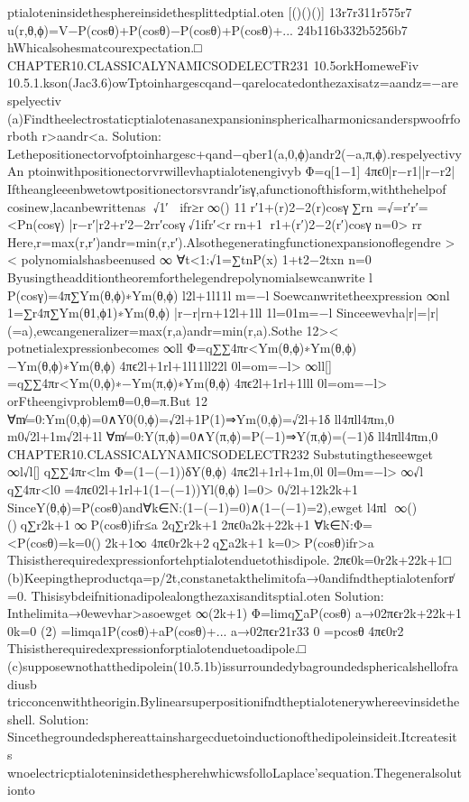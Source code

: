 {{{{{{{{{{{{{{{ptialoteninsidethesphereinsidethesplittedptial.oten
[()()()]
13r7r311r575r7
u(r,θ,ϕ)=V−P(cosθ)+P(cosθ)−P(cosθ)+P(cosθ)+...
24b116b332b5256b7
hWhicalsohesmatcourexpectation.□
CHAPTER10.CLASSICALYNAMICSODELECTR231
10.5orkHomeweFiv
10.5.1.kson(Jac3.6)owTptoinhargescqand−qarelocatedonthezaxisatz=aandz=−arespelyectiv
(a)Findtheelectrostaticptialotenasanexpansioninsphericalharmonicsanderspwoofrforboth
r>aandr<a.
Solution:
Lethepositionectorvofptoinhargesc+qand−qber1(a,0,ϕ)andr2(−a,π,ϕ).respelyectivyAn
ptoinwithpositionectorvrwillevhaptialotenengivyb
Φ=q[1−1]
4πϵ0|r−r1||r−r2|
Iftheangleeenbwetowtpositionectorsvrandr′isγ,afunctionofthisform,withthehelpof
cosinew,lacanbewrittenas
√1′
ifr≥r∞()
11r′1+(r)2−2(r)cosγ∑rn
=√=r′r′=<Pn(cosγ)
|r−r′|r2+r′2−2rr′cosγ√1ifr′<rrn+1
r1+(r′)2−2(r′)cosγn=0>
rr
Here,r=max(r,r′)andr=min(r,r′).Alsothegeneratingfunctionexpansionoflegendre
><
polynomialshasbeenused
∞
∀t<1:√1=∑tnP(x)
1+t2−2txn
n=0
Byusingtheadditiontheoremforthelegendrepolynomialsewcanwrite
l
P(cosγ)=4π∑Ym(θ,ϕ)∗Ym(θ,ϕ)
l2l+1l11l
m=−l
Soewcanwritetheexpression
∞nl
1=∑r4π∑Ym(θ1,ϕ1)∗Ym(θ,ϕ)
|r−r|rn+12l+1ll
1l=01m=−l
Sinceewevha|r|=|r|(=a),ewcangeneralizer=max(r,a)andr=min(r,a).Sothe
12><
potnetialexpressionbecomes
∞ll
Φ=q∑∑4πr<{Ym(θ,ϕ)∗Ym(θ,ϕ)−Ym(θ,ϕ)∗Ym(θ,ϕ)}
4πϵ2l+1rl+1l11ll22l
0l=om=−l>
∞ll[]
=q∑∑4πr<Ym(0,ϕ)∗−Ym(π,ϕ)∗Ym(θ,ϕ)
4πϵ2l+1rl+1lll
0l=om=−l>
orFtheengivproblemθ=0,θ=π.But
12
∀m̸=0:Ym(0,ϕ)=0∧Y0(0,ϕ)=√2l+1P(1)⇒Ym(0,ϕ)=√2l+1δ
ll4πll4πm,0
m0√2l+1m√2l+1l
∀m̸=0:Y(π,ϕ)=0∧Y(π,ϕ)=P(−1)⇒Y(π,ϕ)=(−1)δ
ll4πll4πm,0
CHAPTER10.CLASSICALYNAMICSODELECTR232
Substutingtheseewget
∞l√l[]
q∑∑4πr<lm
Φ=(1−(−1))δY(θ,ϕ)
4πϵ2l+1rl+1m,0l
0l=0m=−l>
∞√l
q∑4πr<l0
=4πϵ02l+1rl+1(1−(−1))Yl(θ,ϕ)
l=0>
0√2l+12k2k+1
SinceY(θ,ϕ)=P(cosθ)and∀k∈N:(1−(−1)=0)∧(1−(−1)=2),ewget
l4πl
∞()
()q∑r2k+1
∞P(cosθ)ifr≤a
2q∑r2k+12πϵ0a2k+22k+1
∀k∈N:Φ=<P(cosθ)=k=0()
2k+1∞
4πϵ0r2k+2q∑a2k+1
k=0>P(cosθ)ifr>a
Thisistherequiredexpressionfortehptialotenduetothisdipole.2πϵ0k=0r2k+22k+1□
(b)Keepingtheproductqa=p/2t,constanetakthelimitofa→0andifndtheptialotenforr̸=0.
Thisisybdeifnitionadipolealongthezaxisanditsptial.oten
Solution:
Inthelimita→0ewevhar>asoewget
∞(2k+1)
Φ=limq∑aP(cosθ)
a→02πϵr2k+22k+1
0k=0
(2)
=limqa1P(cosθ)+aP(cosθ)+...
a→02πϵr21r33
0
=pcosθ
4πϵ0r2
Thisistherequiredexpressionforptialotenduetoadipole.□
(c)supposewnothatthedipolein(10.5.1b)issurroundedybagroundedsphericalshellofradiusb
tricconcenwiththeorigin.Bylinearsuperpositionifndtheptialotenerywhereevinsidetheshell.
Solution:
Sincethegroundedsphereattainshargecduetoinductionofthedipoleinsideit.Itcreatesits
wnoelectricptialoteninsidethespherehwhicwsfolloLaplace’sequation.Thegeneralsolutionto
}}}}}}}}}}}}}}}
